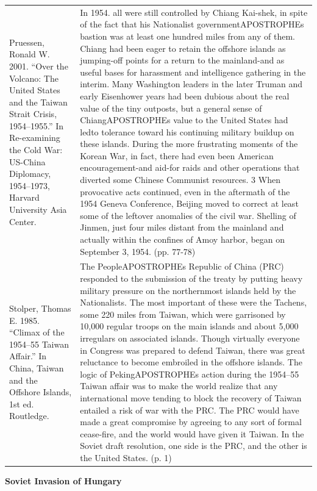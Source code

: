 {\begin{longtable}{p{}p{}}
\\
Pruessen, Ronald W. 2001. “Over the Volcano: The United States and the Taiwan Strait Crisis, 1954–1955.” In Re-examining the Cold War: US-China Diplomacy, 1954–1973, Harvard University Asia Center. & In 1954. all were still controlled by Chiang Kai-shek, in spite of the fact that his Nationalist governmentAPOSTROPHEs bastion was at least one hundred miles from any of them. Chiang had been eager to retain the offshore islands as jumping-off points for a return to the mainland-and as useful bases for harassment and intelligence gathering in the interim. Many Washington leaders in the later Truman and early Eisenhower years had been dubious about the real value of the tiny outposts, but a general sense of ChiangAPOSTROPHEs value to the United States had ledto tolerance toward his continuing military buildup on these islands. During the more frustrating moments of the Korean War, in fact, there had even been American encouragement-and aid-for raids and other operations that diverted some Chinese Communist resources. 3 When provocative acts continued, even in the aftermath of the 1954 Geneva Conference, Beijing moved to correct at least some of the leftover anomalies of the civil war. Shelling of Jinmen, just four miles distant from the mainland and actually within the confines of Amoy harbor, began on September 3, 1954. (pp. 77-78)
\\
Stolper, Thomas E. 1985. “Climax of the 1954–55 Taiwan Affair.” In China, Taiwan and the Offshore Islands, 1st ed. Routledge. & The PeopleAPOSTROPHEs Republic of China (PRC) responded to the submission of the treaty by putting heavy military pressure on the northernmost islands held by the Nationalists. The most important of these were the Tachens, some 220 miles from Taiwan, which were garrisoned by 10,000 regular troops on the main islands and about 5,000 irregulars on associated islands. Though virtually everyone in Congress was prepared to defend Taiwan, there was great reluctance to become embroiled in the offshore islands. The logic of PekingAPOSTROPHEs action during the 1954–55 Taiwan affair was to make the world realize that any international move tending to block the recovery of Taiwan entailed a risk of war with the PRC. The PRC would have made a great compromise by agreeing to any sort of formal cease-fire, and the world would have given it Taiwan. In the Soviet draft resolution, one side is the PRC, and the other is the United States.  (p. 1)
\\
\end{longtable}}
\clearpage
         \textbf{Soviet Invasion of Hungary} 

